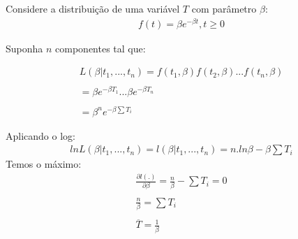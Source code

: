 \documentclass[
  letterpaper,
  DIV=11,
  numbers=noendperiod]{scrartcl}
\begin{document}
\begin{exemplo}

Considere a distribuição de uma variável \(T\) com parâmetro \(\beta\):
\[\begin{array}{ccc}
f(t)=\beta e^{-\beta t}, t \geq 0
\end{array}\]

Suponha \(n\) componentes tal que:

\[\begin{array}{ccc}
L(\beta|t_1,...,t_n) = f(t_1,\beta)f(t_2,\beta)...f(t_n,\beta)
\\
\\
= \beta e^{-\beta T_1}...\beta e^{-\beta T_n}
\\
\\
= \beta^n e^{-\beta \sum T_i}
\end{array}\]

Aplicando o log: \[\begin{array}{ccc}
ln L(\beta|t_1,...,t_n) = l(\beta|t_1,...,t_n) = n .ln \beta - \beta \sum T_i
\end{array}\] Temos o máximo: \[\begin{array}{ccc}
\frac{\partial l(.)}{\partial \beta}=\frac{n}{\beta} -\sum T_i = 0
\\
\\
\frac{n}{\beta} = \sum T_i 
\\
\\
\overline{T}=\frac{1}{\beta}
\end{array}\]

\end{exemplo}
\end{document}
